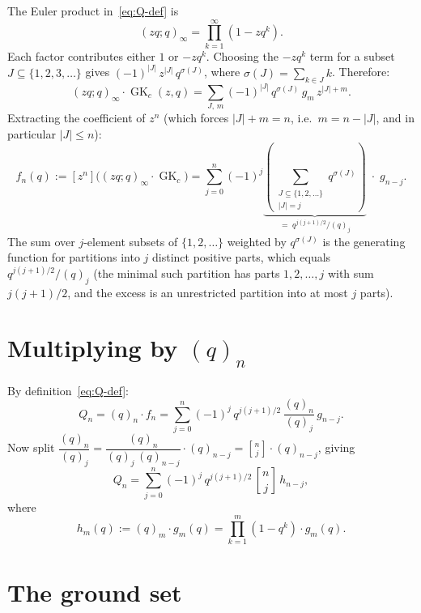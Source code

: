 \documentclass[11pt]{article}
\newcommand{\GK}{\operatorname{GK}}
\newcommand{\qpoch}[2]{(#1;#2)_\infty}
\newcommand{\qbin}[2]{\genfrac{[}{]}{0pt}{}{#1}{#2}}
\theoremstyle{plain}
\theoremstyle{definition}
\begin{document}
The Euler product in~\eqref{eq:Q-def} is
\[
  \qpoch{zq}{q} = \prod_{k=1}^{\infty}(1 - zq^k).
\]
Each factor contributes either $1$ or $-zq^k$.  Choosing
the $-zq^k$ term for a subset $J \subseteq \{1,2,3,\ldots\}$
gives $(-1)^{|J|}\, z^{|J|}\, q^{\sigma(J)}$, where
$\sigma(J) = \sum_{k \in J} k$.  Therefore:
\[
  \qpoch{zq}{q} \cdot \GK_c(z,q)
  = \sum_{J,\, m} (-1)^{|J|}\, q^{\sigma(J)}\,
    g_m\, z^{|J| + m}.
\]
Extracting the coefficient of $z^n$ (which forces
$|J| + m = n$, i.e.\ $m = n - |J|$, and in particular
$|J| \leq n$):
\begin{equation}\label{eq:fn}
  f_n(q)
  := [z^n]\bigl(\qpoch{zq}{q} \cdot \GK_c\bigr)
  = \sum_{j=0}^{n} (-1)^j
    \underbrace{\left(\sum_{\substack{J \subseteq
    \{1,2,\ldots\} \\[2pt] |J| = j}} q^{\sigma(J)}\right)}%
    _{\displaystyle = \; q^{j(j+1)/2} / (q)_j}
    \;\cdot\; g_{n-j}.
\end{equation}
The sum over $j$-element subsets of $\{1,2,\ldots\}$
weighted by $q^{\sigma(J)}$ is the generating function for
partitions into $j$ distinct positive parts, which
equals $q^{j(j+1)/2}/(q)_j$ (the minimal such partition
has parts $1, 2, \ldots, j$ with sum $j(j+1)/2$, and the
excess is an unrestricted partition into at most $j$
parts).


\section{Multiplying by $(q)_n$}

By definition~\eqref{eq:Q-def}:
\[
  Q_n = (q)_n \cdot f_n
  = \sum_{j=0}^{n} (-1)^j\, q^{j(j+1)/2}\,
    \frac{(q)_n}{(q)_j}\, g_{n-j}.
\]
Now split $\dfrac{(q)_n}{(q)_j}
= \dfrac{(q)_n}{(q)_j\,(q)_{n-j}} \cdot (q)_{n-j}
= \qbin{n}{j} \cdot (q)_{n-j}$,
giving
\begin{equation}\label{eq:Q-hm}
  \boxed{\;
  Q_n = \sum_{j=0}^{n} (-1)^j\, q^{j(j+1)/2}\,
    \qbin{n}{j}\, h_{n-j},
  \;}
\end{equation}
where
\begin{equation}\label{eq:hm}
  h_m(q) := (q)_m \cdot g_m(q)
  = \prod_{k=1}^{m}(1-q^k) \cdot g_m(q).
\end{equation}


\section{The ground set}
\end{document}
